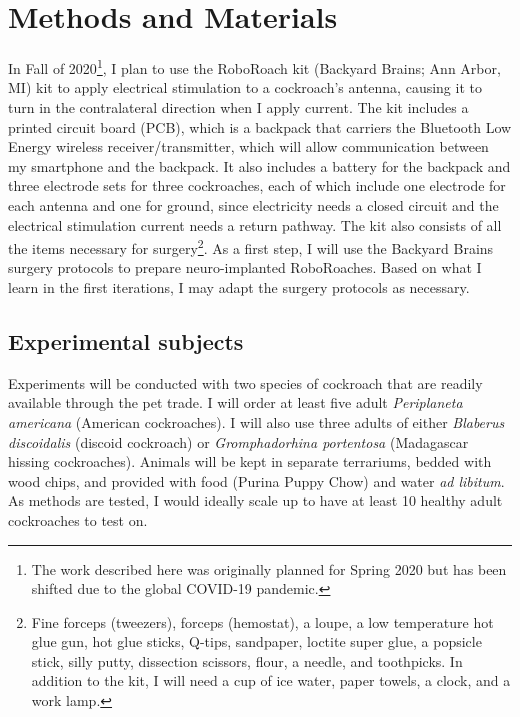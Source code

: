 \section{Methods and Materials}
\label{sec:methods}

In Fall of 2020\footnote{The work described here was originally planned for Spring 2020 but has been shifted due to the global COVID-19 pandemic.}, I plan to use the RoboRoach kit (Backyard Brains; Ann Arbor, MI) kit to apply electrical stimulation to a cockroach's antenna, causing it to turn in the contralateral direction when I apply current. The kit includes a printed circuit board (PCB), which is a backpack that carriers the Bluetooth Low Energy wireless receiver/transmitter, which will allow communication between my smartphone and the backpack. It also includes a battery for the backpack and three electrode sets for three cockroaches, each of which include one electrode for each antenna and one for ground, since electricity needs a closed circuit and the electrical stimulation current needs a return pathway. The kit also consists of all the items necessary for surgery\footnote{Fine forceps (tweezers), forceps (hemostat), a loupe, a low temperature hot glue gun, hot glue sticks, Q-tips, sandpaper, loctite super glue, a popsicle stick, silly putty, dissection scissors, flour, a needle, and toothpicks. In addition to the kit, I will need a cup of ice water, paper towels, a clock, and a work lamp.}. As a first step, I will use the Backyard Brains surgery protocols to prepare neuro-implanted RoboRoaches. Based on what I learn in the first iterations, I may adapt the surgery protocols as necessary. 





\subsection{Experimental subjects}
Experiments will be conducted with two species of cockroach that are readily available through the pet trade. I will order at least five adult \emph{Periplaneta americana} (American cockroaches). I will also use three adults of either \emph{Blaberus discoidalis} (discoid cockroach) or \emph{Gromphadorhina portentosa} (Madagascar hissing cockroaches). Animals will be kept in separate terrariums, bedded with wood chips, and provided with food (Purina Puppy Chow) and water \emph{ad libitum}. As methods are tested, I would ideally scale up to have at least 10 healthy adult cockroaches to test on. 




